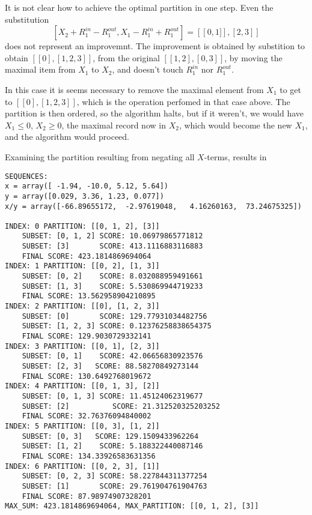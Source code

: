 \documentclass{article}
\theoremstyle{case}
\begin{document}
It is not clear how to achieve the optimal partition in one step. Even the substitution
\[
\left[ X_2 + R_1^{in} - R_1^{out}, X_1 - R_1^{in}+R_1^{out} \right] = \left[ \left[0,1] \right], \left[ 2, 3\right] \right]
\]
does not represent an improvemnt. The improvement is obtained by substition to obtain $\left[ \left[ 0 \right], \left[ 1, 2, 3\right]\right]$, from the original $\left[ \left[ 1, 2\right], \left[ 0, 3\right] \right]$, by moving the maximal item from $X_1$ to $X_2$, and doesn't touch $R_1^{in}$ nor $R_1^{out}$.

In this case it is seems necessary to remove the maximal element from $X_1$ to get to $\left[ \left[ 0 \right], \left[ 1, 2, 3\right]\right]$, which is the operation perfomed in that case above. The partition is then ordered, so the algorithm halts, but if it weren't, we would have $X_1 \leq 0$, $X_2 \geq 0$, the maximal record now in $X_2$, which would become the new $X_1$, and the algorithm would proceed. 

Examining the partition resulting from negating all $X$-terms, results in

\begin{verbatim}
SEQUENCES:
x = array([ -1.94, -10.0, 5.12, 5.64])
y = array([0.029, 3.36, 1.23, 0.077])
x/y = array([-66.89655172,  -2.97619048,   4.16260163,  73.24675325])

INDEX: 0 PARTITION: [[0, 1, 2], [3]]
    SUBSET: [0, 1, 2] SCORE: 10.06979865771812
    SUBSET: [3]       SCORE: 413.1116883116883
    FINAL SCORE: 423.1814869694064
INDEX: 1 PARTITION: [[0, 2], [1, 3]]
    SUBSET: [0, 2]    SCORE: 8.032088959491661
    SUBSET: [1, 3]    SCORE: 5.530869944719233
    FINAL SCORE: 13.562958904210895
INDEX: 2 PARTITION: [[0], [1, 2, 3]]
	SUBSET: [0]       SCORE: 129.77931034482756
    SUBSET: [1, 2, 3] SCORE: 0.12376258838654375
    FINAL SCORE: 129.9030729332141
INDEX: 3 PARTITION: [[0, 1], [2, 3]]
	SUBSET: [0, 1]    SCORE: 42.06656830923576
    SUBSET: [2, 3] 	 SCORE: 88.58270849273144
    FINAL SCORE: 130.6492768019672
INDEX: 4 PARTITION: [[0, 1, 3], [2]]
	SUBSET: [0, 1, 3] SCORE: 11.45124062319677
    SUBSET: [2] 	     SCORE: 21.312520325203252
    FINAL SCORE: 32.76376094840002
INDEX: 5 PARTITION: [[0, 3], [1, 2]]
	SUBSET: [0, 3] 	 SCORE: 129.1509433962264
    SUBSET: [1, 2]    SCORE: 5.188322440087146
    FINAL SCORE: 134.33926583631356
INDEX: 6 PARTITION: [[0, 2, 3], [1]]
	SUBSET: [0, 2, 3] SCORE: 58.227844311377254
    SUBSET: [1]       SCORE: 29.761904761904763
    FINAL SCORE: 87.98974907328201
MAX_SUM: 423.1814869694064, MAX_PARTITION: [[0, 1, 2], [3]]
\end{verbatim}
\end{document}
